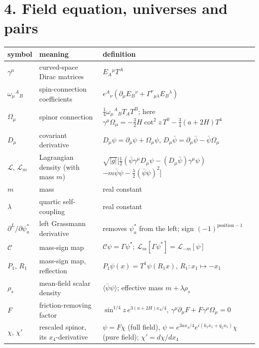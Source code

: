 \documentclass[10pt]{article}
\begin{document}
\section*{4. Field equation, universes and pairs}

{\small\begin{longtable}{>{\raggedright\arraybackslash}p{}>{\raggedright\arraybackslash}p{}>{\raggedright\arraybackslash}p{}}\toprule
symbol & meaning & definition \\\midrule\endhead
\bottomrule\endfoot
$\gamma^\mu$ & curved-space Dirac matrices & $E_A{}^\mu T^A$ \\
$\omega_\mu{}^A{}_B$ & spin-connection coefficients & $e^A{}_\nu(\partial_\mu E_B{}^\nu + \Gamma^\nu{}_{\mu\lambda}E_B{}^\lambda)$ \\
$\Omega_\mu$ & spinor connection & $\frac14\omega_\mu{}^A{}_BT_AT^B$; here $\gamma^\mu\Omega_\mu = -\frac32H\cot^2 z\,T^0 - \frac34(a + 2H)T^4$ \\
$D_\mu$ & covariant derivative & $D_\mu\psi = \partial_\mu\psi + \Omega_\mu\psi$, $D_\mu\bar\psi = \partial_\mu\bar\psi - \bar\psi\Omega_\mu$ \\
$\mathcal L$, $\mathcal L_m$ & Lagrangian density (with mass $m$) & $\sqrt{\lvert g\rvert}[\frac12(\bar\psi\gamma^\mu D_\mu\psi - (D_\mu\bar\psi)\gamma^\mu\psi)$ $- m\bar\psi\psi - \frac\lambda2(\bar\psi\psi)^2]$ \\
$m$ & mass & real constant \\
$\lambda$ & quartic self-coupling & real constant \\
$\partial^L/\partial\psi_a^*$ & left Grassmann derivative & removes $\psi_a^*$ from the left; sign $(-1)^{\text{position} - 1}$ \\
$\mathcal C$ & mass-sign map & $\mathcal C\psi = \Gamma\psi^*$; $\mathcal L_m[\Gamma\psi^*] = \mathcal L_{-m}[\psi]$ \\
$P_1$, $R_1$ & mass-sign map, reflection & $P_1\psi(x) = T^1\psi(R_1x)$, $R_1: x_1 \mapsto -x_1$ \\
$\rho_s$ & mean-field scalar density & $\langle\bar\psi\psi\rangle$; effective mass $m + \lambda\rho_s$ \\
$F$ & friction-removing factor & $\sin^{1/4}z\,e^{3(a+2H)x_4/4}$, $\gamma^\mu\partial_\mu F + F\gamma^\mu\Omega_\mu = 0$ \\
$\chi$, $\chi'$ & rescaled spinor, its $x_4$-derivative & $\psi = F\chi$ (full field), $\psi = e^{3ax_4/4}e^{i(k_1x_1 + q_5x_5)}\chi$ (pure field); $\chi' = d\chi/dx_4$ \\

\end{longtable}}
\end{document}
